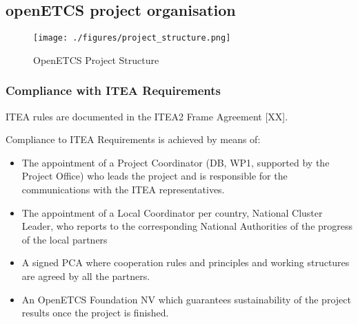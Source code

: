 \documentclass{template/openetcs_article}
\begin{document}
\subsection{openETCS project organisation}

\begin{figure}[H]
\centering
\texttt{[image: ./figures/project\_structure.png]}
\caption{OpenETCS Project Structure}
\end{figure}

\subsubsection{Compliance with ITEA Requirements}
ITEA rules are documented in the ITEA2 Frame Agreement [XX].

Compliance to ITEA Requirements is achieved by means of:
\begin{itemize}
\item The appointment of a Project Coordinator (DB, WP1, supported by the Project Office) who leads the project and is responsible for the communications with the ITEA representatives. 
\item The appointment of a Local Coordinator per country, National Cluster Leader, who reports to the corresponding National Authorities of the progress of the local partners
\item A signed PCA where cooperation rules and principles and working structures are agreed by all the partners.
\item An OpenETCS Foundation NV which guarantees sustainability of the project results once the project is finished.
\end{itemize}
\end{document}
